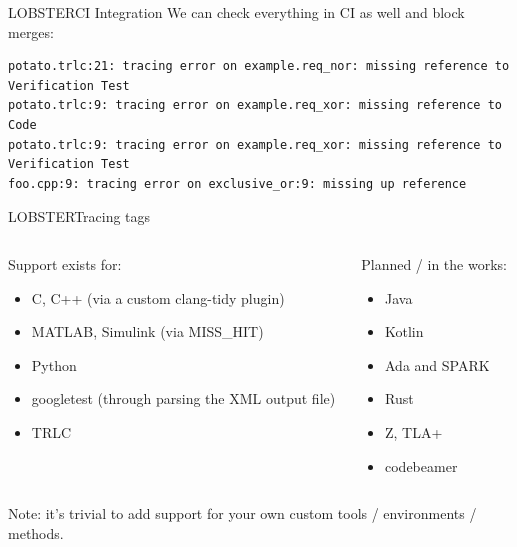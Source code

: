 \documentclass[aspectratio=169]{beamer}
\begin{document}
\begin{frame}[fragile]{LOBSTER}{CI Integration}
  We can check everything in CI as well and block merges:
  \scriptsize
\begin{verbatim}
potato.trlc:21: tracing error on example.req_nor: missing reference to Verification Test
potato.trlc:9: tracing error on example.req_xor: missing reference to Code
potato.trlc:9: tracing error on example.req_xor: missing reference to Verification Test
foo.cpp:9: tracing error on exclusive_or:9: missing up reference
\end{verbatim}
\end{frame}

\begin{frame}{LOBSTER}{Tracing tags}
  \begin{columns}
    \begin{column}{0.5\textwidth}
      Support exists for:
      \begin{itemize}
      \item C, C++ (via a custom clang-tidy plugin)
      \item MATLAB, Simulink (via MISS\_HIT)
      \item Python
      \item googletest (through parsing the XML output file)
      \item TRLC
      \end{itemize}
    \end{column}
    \begin{column}{0.5\textwidth}
      Planned / in the works:
      \begin{itemize}
      \item Java
      \item Kotlin
      \item Ada and SPARK
      \item Rust
      \item Z, TLA+
      \item codebeamer
      \end{itemize}
    \end{column}
  \end{columns}

  \pause
  \vspace{1cm}
  Note: it's trivial to add support for your own custom tools /
  environments / methods.
\end{frame}
\end{document}
